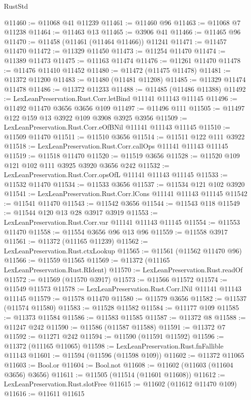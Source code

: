\begin{lexlean}{RustStd}
\begin{coremodule}
@11460 := @11068 @41 @11239
@11461 := @11460 @96
@11463 := @11068 @7 @11238
@11464 := @11463 @13
@11465 := @3906 @41
@11466 := @11465 @96
@11470 := @11458 (@11461 (@11464 @11466)) @11241
@11471 := @11457 @11470
@11472 := @11329 @11450
@11473 := @11254 @11470
@11474 := @11389 @11473
@11475 := @11163 @11474
@11476 := @11261 @11470
@11478 := @11476 @11410 @11452
@11480 := @11472 (@11475 @11478)
@11481 := @11372 @11200
@11483 := @11480 (@11481 @11208)
@11485 := @11329 @11474 @11478
@11486 := @11372 @11233
@11488 := @11485 (@11486 @11388)
@11492 := LexLeanPreservation.Rust.Corr.letBind @11141 @11143 @11145
@11496 := @11492 @11470 @3656 @3656 @109
@11497 := @11496 @111
@11505 := @11497 @122 @159 @13 @3922 @109 @3908 @3925 @3956
@11509 := LexLeanPreservation.Rust.Corr.eOfBNil @11141 @11143 @11145
@11510 := @11509 @11470
@11511 := @11510 @3656
@11514 := @11511 @122 @111 @3922
@11518 := LexLeanPreservation.Rust.Corr.callOps @11141 @11143 @11145
@11519 := @11518 @11470
@11520 := @11519 @3656
@11528 := @11520 @109 @121 @102 @111 @3925 @3920 @3656 @242
@11532 := LexLeanPreservation.Rust.Corr.opsOfL @11141 @11143 @11145
@11533 := @11532 @11470
@11534 := @11533 @3656
@11537 := @11534 @121 @102 @3920
@11541 := LexLeanPreservation.Rust.Corr.lCons @11141 @11143 @11145
@11542 := @11541 @11470
@11543 := @11542 @3656
@11544 := @11543 @118
@11549 := @11544 @120 @13 @28 @3917 @3919
@11553 := LexLeanPreservation.Rust.Corr.var @11141 @11143 @11145
@11554 := @11553 @11470
@11558 := @11554 @3656 @96 @13 @96
@11559 := @11558 @3917
@11561 := @11372 (@11165 @11239)
@11562 := LexLeanPreservation.Rust.ctxLookup
@11565 := @11561 (@11562 @11470 @96)
@11566 := @11559 @11565
@11569 := @11372 (@11165 LexLeanPreservation.Rust.RIdent)
@11570 := LexLeanPreservation.Rust.readOf
@11572 := @11569 (@11570 @3917)
@11573 := @11566 @11572
@11574 := @11549 @11573
@11578 := LexLeanPreservation.Rust.Corr.lNil @11141 @11143 @11145
@11579 := @11578 @11470
@11580 := @11579 @3656
@11582 := @11537 (@11574 @11580)
@11583 := @11528 @11582
@11584 := @11177 @109
@11585 := @11373 @11584
@11586 := @11583 @11585
@11587 := @11372 @8
@11588 := @11247 @242
@11590 := @11586 (@11587 @11588)
@11591 := @11372 @7
@11592 := @11271 @242
@11594 := @11590 (@11591 @11592)
@11596 := @11372 (@11165 @11065)
@11598 := LexLeanPreservation.Rust.fnFallible @11143
@11601 := @11594 (@11596 (@11598 @109))
@11602 := @11372 @11065
@11603 := Bool.or
@11604 := Bool.not
@11608 := @11602 (@11603 (@11604 @3656) @3656)
@11611 := @11505 (@11514 (@11601 @11608))
@11612 := LexLeanPreservation.Rust.slotFree
@11615 := @11602 (@11612 @11470 @109)
@11616 := @11611 @11615

\end{coremodule}
\end{lexlean}
